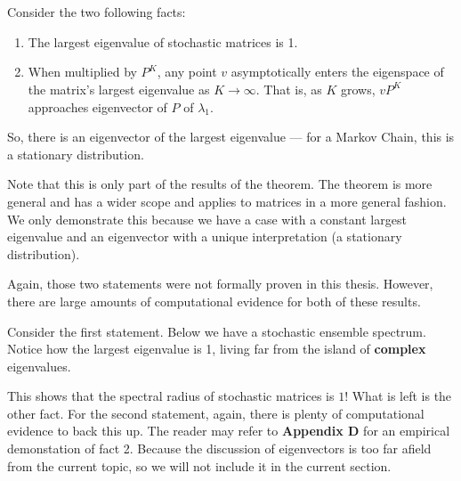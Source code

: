 \begin{theorem} \hfill
  \vspace{-1em}
  \\ \\ Consider the two following facts:
  \begin{enumerate}
    \item The largest eigenvalue of stochastic matrices is 1.
    \item When multiplied by $P^K$, any point $v$ asymptotically enters the eigenspace of the matrix's largest eigenvalue as $K \to \infty$. That is, as $K$ grows, $v P^K$ approaches eigenvector of $P$ of $\lambda_1$.
  \end{enumerate}
So, there is an eigenvector of the largest eigenvalue --- for a Markov Chain, this is a stationary distribution.
\end{theorem}

\begin{note}
  Note that this is only part of the results of the theorem. The theorem is more general and has a wider scope and applies to matrices in a more general fashion.
  We only demonstrate this because we have a case with a constant largest eigenvalue and an eigenvector with a unique interpretation (a stationary distribution).
\end{note}

\newpage

Again, those two statements were not formally proven in this thesis. However, there are large amounts of computational evidence for both of these results.

Consider the first statement. Below we have a stochastic ensemble spectrum.
Notice how the largest eigenvalue is 1, living far from the island of \textbf{complex} eigenvalues.




This shows that the spectral radius of stochastic matrices is $1$! What is left is the other fact.
For the second statement, again, there is plenty of computational evidence to back this up.
The reader may refer to \textbf{Appendix D} for an empirical demonstation of fact 2.
Because the discussion of eigenvectors is too far afield from the current topic, so we will not include it in the current section.

